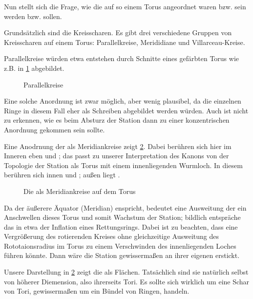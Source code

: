 Nun stellt sich die Frage, wie die  auf so einem Torus angeordnet waren bzw. sein werden bzw. sollen. 

Grundsätzlich sind die  Kreisscharen. Es gibt drei verschiedene Gruppen von Kreisscharen auf einem Torus: Parallelkreise, Merididiane und Villarceau-Kreise. 

Parallelkreise würden etwa entstehen durch Schnitte eines gefärbten Torus wie z.B. in \cref{fig:torus-parallele} abgebildet. 

\begin{figure}[ht!]
    \centering
    
    \caption{Parallelkreise}
    \label{fig:torus-parallele}
\end{figure}

Eine solche Anordnung ist zwar möglich, aber wenig plausibel, da die einzelnen Ringe in diesem Fall eher als Schreiben abgebildet werden würden. Auch ist nicht zu erkennen, wie es beim Absturz der Station dann zu einer konzentrischen Anordnung gekommen sein sollte. 

Eine Anodrnung der  als Meridiankreise  zeigt \cref{fig:torus-meridiane}.  
Dabei berühren sich hier im Inneren eben  und ; das passt zu unserer Interpretation des Kanons von der Topologie der Station als Torus mit einem innenliegenden Wurmloch. In diesem berühren sich innen  und ; außen liegt . 

\begin{figure}[ht!]
    \centering
        
    \caption{Die  als Meridiankreise auf dem Torus}
    \label{fig:torus-meridiane}
\end{figure}


Da der äußerere Äquator (Meridian)  enspricht, bedeutet eine Ausweitung der  ein Anschwellen dieses Torus und somit Wachstum der Station; bildlich entspräche das in etwa der Inflation eines Rettungsrings. Dabei ist zu beachten, dass eine Vergrößerung des rotierenden Kreises ohne gleichzeitige Ausweitung des Rototaionsradius im Torus zu einem Verschwinden des innenliegenden Loches führen könnte. Dann wäre die Station gewissermaßen an ihrer eigenen  erstickt.

Unsere Darstellung in \cref{fig:torus-meridiane} zeigt die  als Flächen. Tatsächlich sind sie natürlich selbst von höherer Diemension, also ihrerseits Tori. Es sollte sich wirklich um eine Schar von Tori, gewissermaßen um ein Bündel von Ringen, handeln.

